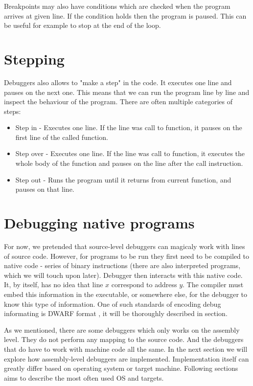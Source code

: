 Breakpoints may also have conditions which are checked when the program arrives at given line. If the condition holds then the program is paused. This can be useful for example to stop at the end of the loop.

\section{Stepping}
Debuggers also allows to "make a step" in the code. It executes one line and pauses on the next one. This means that we can run the program line by line and inspect the behaviour of the program.
There are often multiple categories of steps:

\begin{itemize}
    \item Step in - Executes one line. If the line was call to function, it pauses on the first line of the called function.
    \item Step over - Executes one line. If the line was call to function, it executes the whole body of the function and pauses on the line after the call instruction.
    \item Step out - Runs the program until it returns from current function, and pauses on that line.
\end{itemize}

\section{Debugging native programs}
For now, we pretended that source-level debuggers can magicaly work with lines of source code. However, for programs to be run they first need to be compiled to native code - series of binary instructions (there are also interpreted programs, which we will touch upon later). Debugger then interacts with this native code. It, by itself, has no idea that line $x$ correspond to address $y$. The compiler must embed this information in the executable, or somewhere else, for the debugger to know this type of information. One of such standards of encoding debug informating is DWARF format \cite{dwarf}, it will be thoroughly described in  section.  

As we mentioned, there are some debuggers which only works on the assembly level. They do not perform any mapping to the source code. And the debuggers that do have to work with machine code all the same. In the next section we will explore how assembly-level debuggers are implemented. Implementation itself can greatly differ based on operating system or target machine. Following sections aims to describe the most often used OS and targets.


